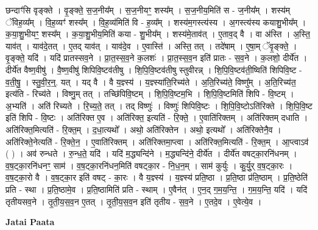 \documentclass[17pt]{extarticle}
\begin{document}
छन्दाꣳ॑सि वृङ्‍क्ते । वृ॒ङ्‍क्ते॒ स॒ज॒नीय᳚म् । स॒ज॒नीयꣳ॒॒ शस्य᳚म् । स॒ज॒नीय॒मिति॑ स - ज॒नीय᳚म् । शस्य॑म् ॅविह॒व्य᳚म् । वि॒ह॒व्यꣳ॑ शस्य᳚म् । वि॒ह॒व्य॑मिति॑ वि - ह॒व्य᳚म् । शस्य॑म॒गस्त्य॑स्य । अ॒गस्त्य॑स्य कयाशु॒भीय᳚म् । क॒या॒शु॒भीयꣳ॒॒ शस्य᳚म् । क॒या॒शु॒भीय॒मिति॑ कया - शु॒भीय᳚म् । शस्य॑मे॒ताव॑त् । ए॒ताव॒द् वै । वा अ॑स्ति । अ॒स्ति॒ याव॑त् । याव॑दे॒तत् । ए॒तद् याव॑त् । याव॑दे॒व । ए॒वास्ति॑ । अस्ति॒ तत् । तदे॑षाम् । ए॒षा॒म् ॅवृ॒ङ्‍क्ते॒ । वृ॒ङ्‍क्ते॒ यदि॑ । यदि॑ प्रातस्सव॒ने । प्रा॒त॒स्स॒व॒ने क॒लशः॑ । प्रा॒त॒स्स॒व॒न इति॑ प्रातः - स॒व॒ने । क॒लशो॒ दीर्ये॑त । दीर्ये॑त वैष्ण॒वीषु॑ । वै॒ष्ण॒वीषु॑ शिपिवि॒ष्टव॑तीषु । शि॒पि॒वि॒ष्टव॑तीषु स्तुवीरन्न् । शि॒पि॒वि॒ष्टव॑ती॒ष्विति॑ शिपिवि॒ष्ट - व॒ती॒षु॒ । स्तु॒वी॒र॒न्॒. यत् । यद् वै । वै य॒ज्ञ्स्य॑ । य॒ज्ञ्स्या॑ति॒रिच्य॑ते । अ॒ति॒रिच्य॑ते॒ विष्णु᳚म् । अ॒ति॒रिच्य॑त॒ इत्य॑ति - रिच्य॑ते । विष्णु॒म् तत् । तच्छि॑पिवि॒ष्टम् । शि॒पि॒वि॒ष्टम॒भि । शि॒पि॒वि॒ष्टमिति॑ शिपि - वि॒ष्टम् । अ॒भ्यति॑ । अति॑ रिच्यते । रि॒च्य॒ते॒ तत् । तद् विष्णुः॑ । विष्णुः॑ शिपिवि॒ष्टः । शि॒पि॒वि॒ष्टोऽति॑रिक्ते । शि॒पि॒वि॒ष्ट इति॑ शिपि - वि॒ष्टः । अति॑रिक्त ए॒व । अति॑रिक्त॒ इत्यति॑ - रि॒क्ते॒ । ए॒वाति॑रिक्तम् । अति॑रिक्तम् दधाति । अति॑रिक्त॒मित्यति॑ - रि॒क्त॒म् । द॒धा॒त्यथो᳚ । अथो॒ अति॑रिक्तेन । अथो॒ इत्यथो᳚ । अति॑रिक्तेनै॒व । अति॑रिक्ते॒नेत्यति॑ - रि॒क्ते॒न॒ । ए॒वाति॑रिक्तम् । अति॑रिक्तमा॒प्त्वा । अति॑रिक्त॒मित्यति॑ - रि॒क्त॒म् । आ॒प्त्वाऽव॑ ( ) । अव॑ रुन्धते । रु॒न्ध॒ते॒ यदि॑ । यदि॑ म॒द्ध्यन्दि॑ने । म॒द्ध्यन्दि॑ने॒ दीर्ये॑त । दीर्ये॑त वषट्का॒रनि॑धनम् । व॒ष॒ट्का॒रनि॑धनꣳ॒॒ साम॑ । व॒ष॒ट्का॒रनि॑धन॒मिति॑ वषट्का॒र - नि॒ध॒न॒म् । साम॑ कुर्युः । कु॒र्यु॒र् व॒ष॒ट्का॒रः । व॒ष॒ट्का॒रो वै । व॒ष॒ट्का॒र इति॑ वषट् - का॒रः । वै य॒ज्ञ्स्य॑ । य॒ज्ञ्स्य॑ प्रति॒ष्ठा । प्र॒ति॒ष्ठा प्र॑ति॒ष्ठाम् । प्र॒ति॒ष्ठेति॑ प्रति - स्था । प्र॒ति॒ष्ठामे॒व । प्र॒ति॒ष्ठामिति॑ प्रति - स्थाम् । ए॒वैन॑त् । ए॒न॒द् ग॒म॒य॒न्ति॒ । ग॒म॒य॒न्ति॒ यदि॑ । यदि॑ तृतीयसव॒ने । तृ॒ती॒य॒स॒व॒न ए॒तत् । तृ॒ती॒य॒स॒व॒न इति॑ तृतीय - स॒व॒ने । ए॒तदे॒व । ए॒वेत्ये॒व । \newline

\textbf{Jatai Paata} \newline
\end{document}
